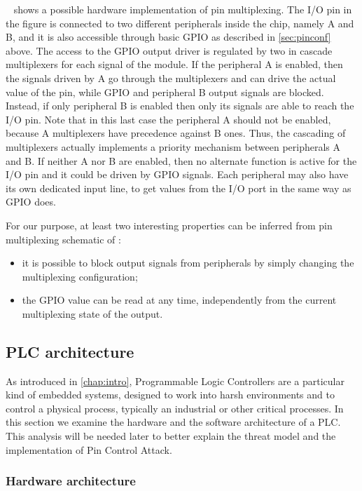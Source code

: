 \myfig{\ref{fig:pinmux}}~ shows a possible hardware implementation of pin multiplexing.
The I/O pin in the figure is connected to two different peripherals inside the chip, namely A and B,
and it is also accessible through basic GPIO as described in \sec \ref{sec:pinconf} above.
The access to the GPIO output driver is regulated by two in cascade multiplexers for each signal of the module.
If the peripheral A is enabled, then the signals driven by A go through the multiplexers and can drive the actual value of the pin,
while GPIO and peripheral B output signals are blocked. Instead, if only peripheral B is enabled then only its signals are able to reach the I/O pin.
Note that in this last case the peripheral A should not be enabled, because A multiplexers have precedence against B ones.
Thus, the cascading of multiplexers actually implements a priority mechanism between peripherals A and B.
If neither A nor B are enabled, then no alternate function is active for the I/O pin and it could be driven by GPIO signals.
Each peripheral may also have its own dedicated input line, to get values from the I/O port in the same way as GPIO does.

For our purpose, at least two interesting properties can be inferred from pin multiplexing schematic of \myfig{\ref{fig:pinmux}}:
\begin{itemize}
	\item it is possible to block output signals from peripherals by simply changing the multiplexing configuration;
	\item the GPIO value can be read at any time, independently from the current multiplexing state of the output.
\end{itemize}


\subsection{PLC architecture}

As introduced in \chap \ref{chap:intro}, Programmable Logic Controllers are a particular kind of embedded systems,
designed to work into harsh environments and to control a physical process, typically an industrial or other critical processes.
In this section we examine the hardware and the software architecture of a PLC. This analysis will be needed later to better explain
the threat model and the implementation of Pin Control Attack.


\subsubsection{Hardware architecture}

